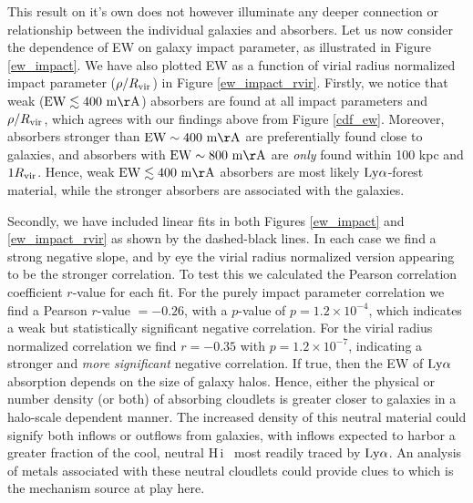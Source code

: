 \documentclass[twocolumn,tighten]{aastex62}
\newcommand{\HI}{\mbox{H\,{\sc i}} }
\begin{document}
This result on it's own does not however illuminate any deeper connection or relationship between the individual galaxies and absorbers. Let us now consider the dependence of EW on galaxy impact parameter, as illustrated in Figure \ref{ew_impact}. We have also plotted EW as a function of virial radius normalized impact parameter ($\rho/ R_{\rm vir}$) in Figure \ref{ew_impact_rvir}. Firstly, we notice that weak ($\rm EW \lesssim 400~m\AA$) absorbers are found at all impact parameters and $\rho / R_{\rm vir}$, which agrees with our findings above from Figure \ref{cdf_ew}. Moreover, absorbers stronger than $\rm EW \sim 400~m\AA$ are preferentially found close to galaxies, and absorbers with $\rm EW \sim 800~m\AA$ are \emph{only} found within 100 kpc and $1 R_{\rm vir}$. Hence, weak $\rm EW \lesssim 400~m\AA$ absorbers are most likely $\rm Ly\alpha$-forest material, while the stronger absorbers are associated with the galaxies.

Secondly, we have included linear fits in both Figures \ref{ew_impact} and \ref{ew_impact_rvir} as shown by the dashed-black lines. In each case we find a strong negative slope, and by eye the virial radius normalized version appearing to be the stronger correlation. To test this we calculated the Pearson correlation coefficient $r$-value for each fit. For the purely impact parameter correlation we find a Pearson $r$-value $=-0.26$, with a $p$-value of $p = 1.2 \times 10^{-4}$, which indicates a weak but statistically significant negative correlation. For the virial radius normalized correlation we find $r = -0.35$ with $p = 1.2 \times 10^{-7}$, indicating a stronger and \emph{more significant} negative correlation. If true, then the EW of $\rm Ly\alpha$ absorption depends on the size of galaxy halos. Hence, either the physical or number density (or both) of absorbing cloudlets is greater closer to galaxies in a halo-scale dependent manner. The increased density of this neutral material could signify both inflows or outflows from galaxies, with inflows expected to harbor a greater fraction of the cool, neutral \HI~most readily traced by $\rm Ly\alpha$. An analysis of metals associated with these neutral cloudlets could provide clues to which is the mechanism source at play here.
\end{document}
